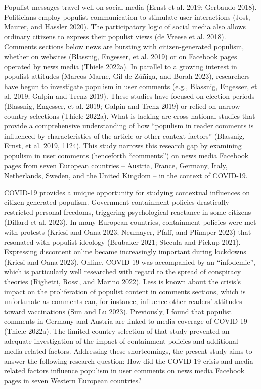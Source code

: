 \documentclass[
]{ccr}
\begin{document}
Populist messages travel well on social media (Ernst et al. 2019;
Gerbaudo 2018). Politicians employ populist communication to stimulate
user interactions (Jost, Maurer, and Hassler 2020). The participatory
logic of social media also allows ordinary citizens to express their
populist views (de Vreese et al. 2018). Comments sections below news are
bursting with citizen-generated populism, whether on websites (Blassnig,
Engesser, et al. 2019) or on Facebook pages operated by news media
(Thiele 2022a). In parallel to a growing interest in populist attitudes
(Marcos-Marne, Gil de Zúñiga, and Borah 2023), researchers have begun to
investigate populism in user comments (e.g., Blassnig, Engesser, et al.
2019; Galpin and Trenz 2019). These studies have focused on election
periods (Blassnig, Engesser, et al. 2019; Galpin and Trenz 2019) or
relied on narrow country selections (Thiele 2022a). What is lacking are
cross-national studies that provide a comprehensive understanding of how
``populism in reader comments is influenced by characteristics of the
article or other context factors'' (Blassnig, Ernst, et al. 2019, 1124).
This study narrows this research gap by examining populism in user
comments (henceforth ``comments'') on news media Facebook pages from
seven European countries -- Austria, France, Germany, Italy,
Netherlands, Sweden, and the United Kingdom -- in the context of
COVID-19.

COVID-19 provides a unique opportunity for studying contextual
influences on citizen-generated populism. Government containment
policies drastically restricted personal freedoms, triggering
psychological reactance in some citizens (Dillard et al. 2023). In many
European countries, containment policies were met with protests (Kriesi
and Oana 2023; Neumayer, Pfaff, and Plümper 2023) that resonated with
populist ideology (Brubaker 2021; Stecula and Pickup 2021). Expressing
discontent online became increasingly important during lockdowns (Kriesi
and Oana 2023). Online, COVID-19 was accompanied by an ``infodemic'',
which is particularly well researched with regard to the spread of
conspiracy theories (Righetti, Rossi, and Marino 2022). Less is known
about the crisis's impact on the proliferation of populist content in
comments sections, which is unfortunate as comments can, for instance,
influence other readers' attitudes toward vaccinations (Sun and Lu
2023). Previously, I found that populist comments in Germany and Austria
are linked to media coverage of COVID-19 (Thiele 2022a). The limited
country selection of that study prevented an adequate investigation of
the impact of containment policies and additional media-related factors.
Addressing these shortcomings, the present study aims to answer the
following research question: How did the COVID-19 crisis and
media-related factors influence populism in user comments on news media
Facebook pages in seven Western European countries?
\end{document}
